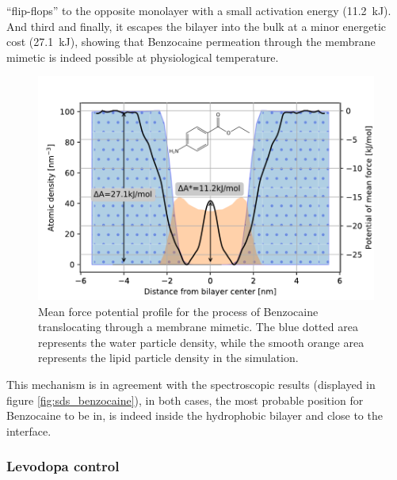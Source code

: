 \documentclass[3p,preprint,review]{elsarticle}
\begin{document}
	``flip-flops'' to the opposite monolayer with a small activation
	energy (\SI{11.2}{\kilo\joule}). And third and finally, it escapes the bilayer
	into the bulk at a minor energetic cost (\SI{27.1}{kJ}), showing that
	Benzocaine
	permeation through the membrane mimetic is indeed possible at physiological temperature.\\
	\begin{figure}[htb]
		\centering
		\includegraphics[width=\columnwidth]{benzo_profile_density}
		\caption{Mean force potential profile for the process of Benzocaine
			translocating through a membrane mimetic. The blue dotted area represents
			the water particle density, while the smooth orange area represents the
			lipid particle density in the simulation.}
		\label{fig:benzocaine_profile}
	\end{figure}
	This mechanism is in agreement with the spectroscopic results
	(displayed in figure \ref{fig:sds_benzocaine}), in both cases, the most
	probable
	position for Benzocaine to be in, is indeed inside the hydrophobic bilayer and close to the
	interface.\\
	
	\subsubsection{Levodopa control}
	\label{sec:ldopa}
	
\end{document}
